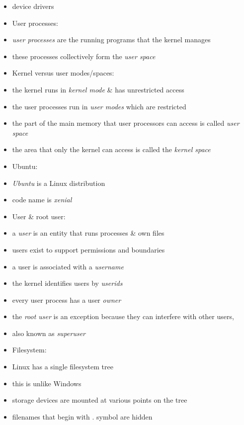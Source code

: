 \documentclass[twocolumn]{IEEEtran} %
\begin{document}
\begin{itemize}
            \item device drivers
        \ei
    \ei
    \item User processes:
    \bi
        \item \emph{user processes} are the running programs that the kernel manages
        \item these processes collectively form the \emph{user space}
    \ei
    \item Kernel versus user modes/spaces:
    \bi
        \item the kernel runs in \emph{kernel mode} \& has unrestricted access
        \item the user processes run in \emph{user modes} which are restricted
        \item the part of the main memory that user processors can access is called \emph{user space}
        \item the area that only the kernel can access is called the \emph{kernel space}
    \ei
    \item Ubuntu:
    \bi
        \item \emph{Ubuntu} is a Linux distribution
        \item code name is \emph{xenial}
    \ei
    \item User \& root user:
    \bi
        \item a \emph{user} is an entity that runs processes \& own files
        \bi
            \item users exist to support permissions and boundaries
        \ei
        \item a user is associated with a \emph{username}
        \item the kernel identifies users by \emph{userids}
        \item every user process has a user \emph{owner}
        \item the \emph{root user} is an exception because they can interfere with other users,
        \bi
            \item also known as \emph{superuser}
        \ei
    \ei
    \item Filesystem:
    \bi
	   \item Linux has a single filesystem tree
	   \bi
            \item this is unlike Windows
            \item storage devices are mounted at various points on the tree
	   \ei
	   \item filenames that begin with . symbol are hidden

\end{itemize}
\end{document}
